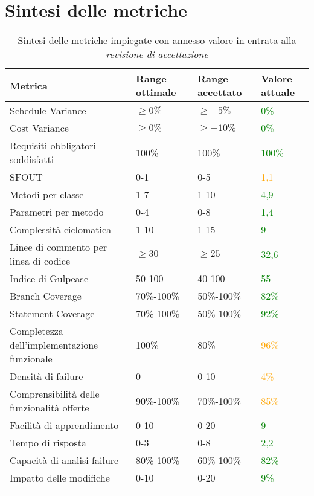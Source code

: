 \section{Sintesi delle metriche}
\label{metr}
\begin{longtable}[H]{|C{5cm}|C{3.5cm}|C{3.5cm}|C{3.5cm}|}
	    \hline
		\textbf{Metrica} & \textbf{Range ottimale} & \textbf{Range accettato} & \textbf{Valore attuale} \\ \hline
		Schedule Variance & $\geq0\%$ & $\geq-5\%$ & \textcolor{green}{0\%} \\ \hline
		Cost Variance & $\geq0\%$ & $\geq-10\%$ & \textcolor{green}{0\%} \\ \hline
		Requisiti obbligatori soddisfatti & 100\% & 100\% & \textcolor{green}{100\%} \\ \hline
		SFOUT & 0-1 & 0-5  & \textcolor{orange}{1,1} \\ \hline
		Metodi per classe & 1-7 & 1-10 & \textcolor{green}{4,9} \\ \hline
		Parametri per metodo & 0-4 & 0-8 & \textcolor{green}{1,4} \\ \hline
		Complessità ciclomatica & 1-10 & 1-15 & \textcolor{green}{9} \\ \hline
		Linee di commento per linea di codice & $\geq30$ & $\geq25$ & \textcolor{green}{32,6} \\ \hline
		Indice di Gulpease & 50-100 & 40-100 & \textcolor{green}{55} \\ \hline
		Branch Coverage & 70\%-100\% & 50\%-100\% & \textcolor{green}{82\%} \\ \hline
		Statement Coverage & 70\%-100\% & 50\%-100\% & \textcolor{green}{92\%} \\ \hline
		Completezza dell'implementazione funzionale & 100\% & 80\% & \textcolor{orange}{96\%} \\ \hline
		Densità di failure & 0 & 0-10 & \textcolor{orange}{4\%} \\ \hline
		Comprensibilità delle funzionalità offerte & 90\%-100\% & 70\%-100\% & \textcolor{orange}{85\%} \\ \hline
		Facilità di apprendimento & 0-10 & 0-20 & \textcolor{green}{9}\\ \hline
		Tempo di risposta & 0-3 & 0-8 & \textcolor{green}{2,2} \\ \hline
		Capacità di analisi failure & 80\%-100\% & 60\%-100\% & \textcolor{green}{82\%} \\ \hline
		Impatto delle modifiche & 0-10 & 0-20 & \textcolor{green}{9\%} \\ \hline
		\caption{Sintesi delle metriche impiegate con annesso valore in entrata alla \emph{revisione di accettazione} }
\end{longtable}
